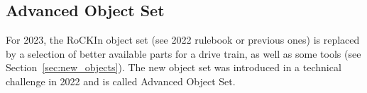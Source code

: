 %
%
%



\clearpage
\subsection{Advanced Object Set}


For 2023, the RoCKIn object set (see 2022 rulebook or previous ones) is replaced by a selection of better available parts for a drive train, as well as some tools (see Section~\ref{sec:new_objects}). The new object set was introduced in a technical challenge in 2022 and is called Advanced Object Set.

